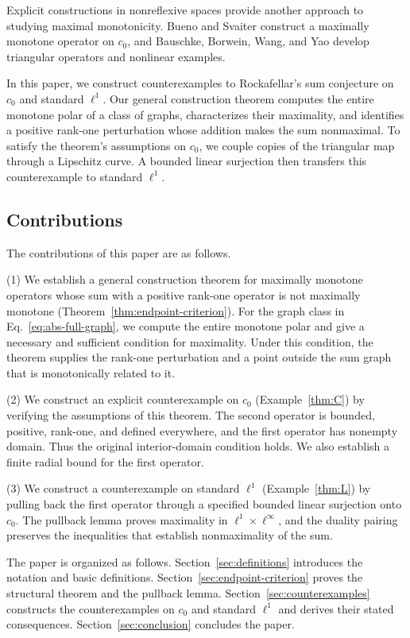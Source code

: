 Explicit constructions in nonreflexive spaces provide another approach
to studying maximal monotonicity. Bueno and Svaiter
\cite{buenosvaiter2011} construct a maximally monotone operator on $c_0$,
and Bauschke, Borwein, Wang, and Yao \cite{bauschkeetal2011} develop
triangular operators and nonlinear examples.

In this paper, we construct counterexamples to Rockafellar's sum
conjecture on $c_0$ and standard $\ell^1$. Our general construction
theorem computes the entire monotone polar of a class of graphs,
characterizes their maximality, and identifies a positive rank-one
perturbation whose addition makes the sum nonmaximal. To satisfy the
theorem's assumptions on $c_0$, we couple copies of the triangular map through a
Lipschitz curve. A bounded linear surjection then transfers this
counterexample to standard $\ell^1$. 

\subsection{Contributions}
The contributions of this paper are as follows.

(1) We establish a general construction theorem for maximally monotone
operators whose sum with a positive rank-one operator is not maximally
monotone (Theorem~\ref{thm:endpoint-criterion}). For the graph class in
Eq.~\eqref{eq:abs-full-graph}, we compute the entire monotone polar and
give a necessary and sufficient condition for maximality. Under this
condition, the theorem supplies the rank-one perturbation and a point
outside the sum graph that is monotonically related to it.

(2) We construct an explicit counterexample on $c_0$
(Example~\ref{thm:C}) by verifying the assumptions of this theorem.
The second operator is bounded, positive, rank-one, and defined everywhere,
and the first operator has nonempty domain. Thus the original
interior-domain condition holds. We also establish a finite radial
bound for the first operator.

(3) We construct a counterexample on standard $\ell^1$
(Example~\ref{thm:L}) by pulling back the first operator through a
specified bounded linear surjection onto $c_0$. The pullback lemma
proves maximality in $\ell^1\times\ell^\infty$, and the duality pairing
preserves the inequalities that establish nonmaximality of the sum.

The paper is organized as follows. Section~\ref{sec:definitions}
introduces the notation and basic definitions.
Section~\ref{sec:endpoint-criterion} proves the structural theorem and
the pullback lemma. Section~\ref{sec:counterexamples} constructs the
counterexamples on $c_0$ and standard $\ell^1$ and derives their stated
consequences. Section~\ref{sec:conclusion} concludes the paper. 


